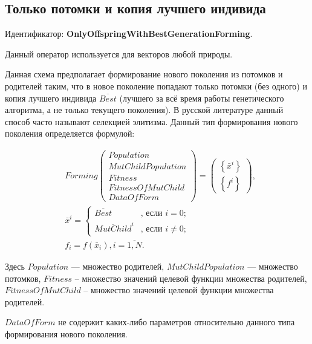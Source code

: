 \subsection{Только потомки и копия лучшего индивида}\label{SetOfOperatorsAlgorithms:OnlyOffspringWithBestGenerationForming}

Идентификатор: \textbf{OnlyOffspringWithBestGenerationForming}.

Данный оператор используется для векторов любой природы.

Данная схема предполагает формирование нового поколения из потомков и родителей таким, что в новое поколение попадают только потомки (без одного) и копия лучшего индивида $ \overline{Best} $ (лучшего за всё время работы генетического алгоритма, а не только текущего поколения). В русской литературе данный способ часто называют селекцией элитизма. Данный тип формирования нового поколения определяется формулой:

\begin{align}
\label{SetOfOperatorsAlgorithms:eq:OnlyOffspringWithBestGenerationForming}
&Forming \left( \begin{array}{c} Population\\MutChildPopulation\\Fitness\\FitnessOfMutChild\\DataOfForm\end{array}\right) =\left( \begin{array}{c} \left\lbrace \bar{x}^i\right\rbrace \\\left\lbrace f^i\right\rbrace\end{array}\right),\\&\bar{x}^i=\left\lbrace \begin{aligned}
\overline{Best}&\text{, если }i=0; \\ \overline{MutChild}^i&\text{, если }i\neq 0;
\end{aligned}\right.\nonumber\\
&f_i=f\left( \bar{x}_i\right), i=\overline{1,N}.\nonumber
\end{align}

Здесь $ Population $ --- множество родителей, $MutChildPopulation$ --- множество потомков, $ Fitness $ -- множество значений целевой функции множества родителей, $ FitnessOfMutChild $ -- множество значений целевой функции множества родителей. 

$ DataOfForm $ не содержит каких-либо параметров относительно данного типа формирования нового поколения.